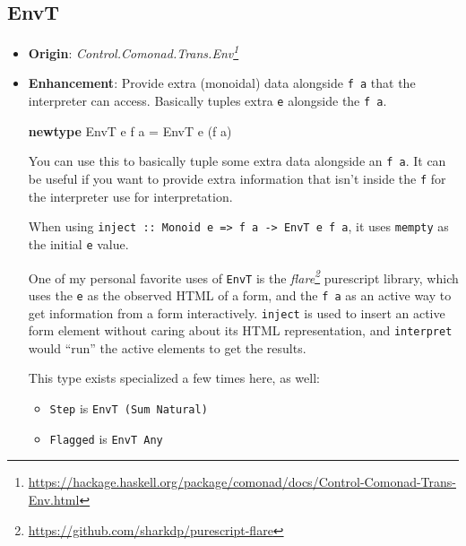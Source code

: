 \documentclass[]{article}
\newenvironment{Shaded}{}{}
\newcommand{\DataTypeTok}[1]{\textcolor[rgb]{0.56,0.13,0.00}{#1}}
\newcommand{\KeywordTok}[1]{\textcolor[rgb]{0.00,0.44,0.13}{\textbf{#1}}}
\newcommand{\NormalTok}[1]{#1}
\newcommand{\OtherTok}[1]{\textcolor[rgb]{0.00,0.44,0.13}{#1}}
\renewcommand{\href}[2]{#2\footnote{\url{#1}}}
\begin{document}
\hypertarget{envt}{%
\subsection{EnvT}\label{envt}}

\begin{itemize}
\item
  \textbf{Origin}:
  \emph{\href{https://hackage.haskell.org/package/comonad/docs/Control-Comonad-Trans-Env.html}{Control.Comonad.Trans.Env}}
\item
  \textbf{Enhancement}: Provide extra (monoidal) data alongside \texttt{f\ a}
  that the interpreter can access. Basically tuples extra \texttt{e} alongside
  the \texttt{f\ a}.

\begin{Shaded}
\begin{Highlighting}[]
\KeywordTok{newtype} \DataTypeTok{EnvT}\NormalTok{ e f a }\OtherTok{=} \DataTypeTok{EnvT}\NormalTok{ e (f a)}
\end{Highlighting}
\end{Shaded}

  You can use this to basically tuple some extra data alongside an
  \texttt{f\ a}. It can be useful if you want to provide extra information that
  isn't inside the \texttt{f} for the interpreter use for interpretation.

  When using
  \texttt{inject\ ::\ Monoid\ e\ =\textgreater{}\ f\ a\ -\textgreater{}\ EnvT\ e\ f\ a},
  it uses \texttt{mempty} as the initial \texttt{e} value.

  One of my personal favorite uses of \texttt{EnvT} is the
  \emph{\href{https://github.com/sharkdp/purescript-flare}{flare}} purescript
  library, which uses the \texttt{e} as the observed HTML of a form, and the
  \texttt{f\ a} as an active way to get information from a form interactively.
  \texttt{inject} is used to insert an active form element without caring about
  its HTML representation, and \texttt{interpret} would ``run'' the active
  elements to get the results.

  This type exists specialized a few times here, as well:

  \begin{itemize}
  \tightlist
  \item
    \texttt{Step} is \texttt{EnvT\ (Sum\ Natural)}
  \item
    \texttt{Flagged} is \texttt{EnvT\ Any}
  \end{itemize}
\end{itemize}
\end{document}
